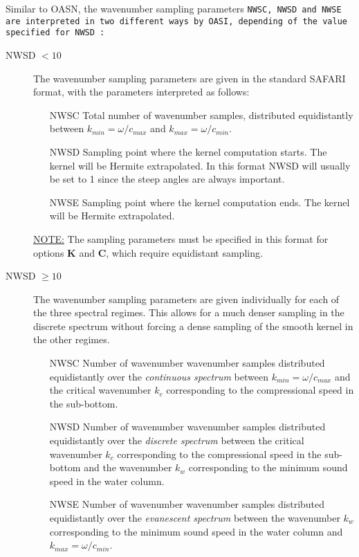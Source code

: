 Similar to OASN, the wavenumber sampling parameters \tt NWSC, NWSD \rm and \tt NWSE \rm are
interpreted in two different ways by OASI, depending of the
value specified for \tt NWSD \rm:

\begin{description}
\item[NWSD $< 10$] The wavenumber sampling parameters are given in the standard
SAFARI format, with the parameters interpreted as follows:
	\begin{itemize}
	\item[NWSC] Total number of wavenumber samples, distributed
		equidistantly between $k_{min} = \omega / c_{max} $ and 
		$k_{max} = \omega / c_{min} $.
	\item[NWSD] Sampling point where the kernel computation starts. The
		kernel will be Hermite extrapolated. In
		this  format NWSD will usually be set to 1 since the
		steep  angles are always important. 
	\item[NWSE] Sampling point where the kernel computation ends. The
		kernel will be Hermite extrapolated.
	\end{itemize} 
\underline{NOTE:} The sampling parameters must be specified in this format for options {\bf K} and {\bf C}, which require equidistant sampling.
\item[NWSD $\ge 10$] The wavenumber sampling parameters are given
individually for each of the three spectral regimes. This allows for a
much denser sampling in the discrete spectrum without forcing a dense sampling
of the smooth kernel in the other regimes. 
	\begin{itemize}
	\item[NWSC] Number of wavenumber wavenumber samples distributed
		equidistantly over the {\em continuous spectrum} 
		between $k_{min} = \omega / c_{max} $ and
		the critical wavenumber $k_c$ corresponding to the 
		compressional speed in the sub-bottom. 
	\item[NWSD] Number of wavenumber wavenumber samples distributed
		equidistantly over the {\em discrete spectrum} 
		between the critical wavenumber $k_c$ corresponding to the 
		compressional speed in the sub-bottom and the
		wavenumber $k_w$ corresponding to the minimum sound
		speed in the water column.  
	\item[NWSE] Number of wavenumber wavenumber samples distributed
		equidistantly over the {\em evanescent spectrum} 
		between the
		wavenumber $k_w$ corresponding to the minimum sound
		speed in the water column and $k_{max} = \omega / c_{min} $.  
	\end{itemize} 
\end{description}

